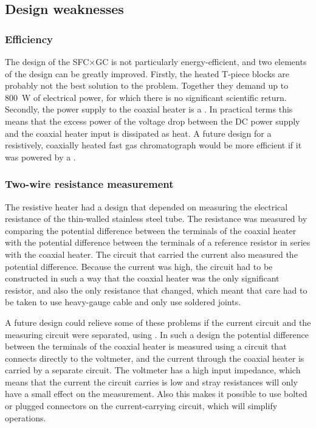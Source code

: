 \subsection{Design weaknesses}

\subsubsection{Efficiency}

The design of the SFC×GC is not particularly energy-efficient, and two elements
of the design can be greatly improved. Firstly, the heated T-piece blocks are
probably not the best solution to the problem. Together they demand up to
\SI{800}{\watt} of electrical power, for which there is no significant
scientific return. Secondly, the power supply to the coaxial heater is a
. In practical terms this means that the excess
power of the voltage drop between the DC power supply and the coaxial heater
input is dissipated as heat. A future design for a resistively, coaxially heated
fast gas chromatograph would be more efficient if it was powered by a
.

\subsubsection{Two-wire resistance measurement}

The resistive heater had a design that depended on measuring the electrical
resistance of the thin-walled stainless steel tube. The resistance was measured
by comparing the potential difference between the terminals of the coaxial
heater with the potential difference between the terminals of a reference
resistor in series with the coaxial heater. The circuit that carried the current
also measured the potential difference. Because the current was high, the
circuit had to be constructed in such a way that the coaxial heater was the only
significant resistor, and also the only resistance that changed, which meant
that care had to be taken to use heavy-gauge cable and only use soldered joints.

A future design could relieve some of these problems if the current circuit and
the measuring circuit were separated, using . In such a design the potential difference between the terminals of
the coaxial heater is measured using a circuit that connects directly to the
voltmeter, and the current through the coaxial heater is carried by a separate
circuit. The voltmeter has a high input impedance, which means that the current
the circuit carries is low and stray resistances will only have a small effect
on the measurement. Also this makes it possible to use bolted or plugged
connectors on the current-carrying circuit, which will simplify operations.

